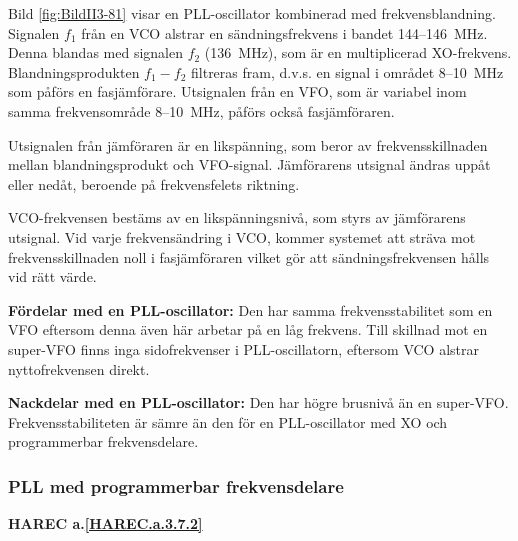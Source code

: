 Bild \ref{fig:BildII3-81} visar en PLL-oscillator kombinerad med
frekvensblandning.
Signalen \(f_1\) från en VCO alstrar en sändningsfrekvens i bandet
144--146~MHz.
Denna blandas med signalen \(f_2\) (136~MHz), som är en multiplicerad
XO-frekvens.
Blandningsprodukten \(f_1 - f_2\) filtreras fram, d.v.s. en signal i området
8--10~MHz som påförs en fasjämförare.
Utsignalen från en VFO, som är variabel inom samma frekvensområde 8--10~MHz,
påförs också fasjämföraren.

Utsignalen från jämföraren är en likspänning, som beror av frekvensskillnaden
mellan blandningsprodukt och VFO-signal.
Jämförarens utsignal ändras uppåt eller nedåt, beroende på frekvensfelets
riktning.

VCO-frekvensen bestäms av en likspänningsnivå, som styrs av jämförarens
utsignal.
Vid varje frekvensändring i VCO, kommer systemet att sträva mot
frekvensskillnaden noll i fasjämföraren vilket gör att sändningsfrekvensen
hålls vid rätt värde.

\textbf{Fördelar med en PLL-oscillator:}
Den har samma frekvensstabilitet som en VFO eftersom denna även här arbetar på
en låg frekvens.
Till skillnad mot en super-VFO finns inga sidofrekvenser i PLL-oscillatorn,
eftersom VCO alstrar nyttofrekvensen direkt.

\textbf{Nackdelar med en PLL-oscillator:}
Den har högre brusnivå än en super-VFO.
Frekvensstabiliteten är sämre än den för en PLL-oscillator med XO och
programmerbar frekvensdelare.

\subsubsection{PLL med programmerbar frekvensdelare}
\textbf{HAREC a.\ref{HAREC.a.3.7.2}\label{myHAREC.a.3.7.2}}

